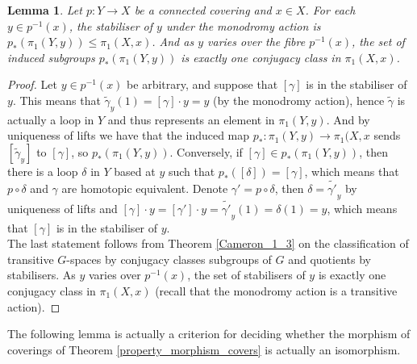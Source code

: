 \documentclass{article}
\theoremstyle{plain}
\newtheorem{lemma}[theorem]{Lemma}
\theoremstyle{definition}
\begin{document}
\begin{lemma}
\label{induced_subgroup}
    Let $p:Y\rightarrow X$ be a connected covering and $x\in X$. For each $y\in p^{-1}(x)$, the stabiliser of $y$ under the monodromy action is $p_*(\pi_1(Y,y)) \leq \pi_1(X,x)$. And as $y$ varies over the fibre $p^{-1}(x)$, the set of induced subgroups $p_*(\pi_1(Y,y))$ is exactly one conjugacy class in $\pi_1(X,x)$.
\end{lemma}
\begin{proof}
    Let $y\in p^{-1}(x)$ be arbitrary, and suppose that $[\gamma]$ is in the stabiliser of $y$.
    This means that $\widetilde{\gamma}_y(1) = [\gamma]\cdot y = y$ (by the monodromy action), hence $\widetilde{\gamma}$ is actually a loop in $Y$ and thus represents an element in $\pi_1(Y,y)$. And by uniqueness of lifts we have that the induced map $p_* : \pi_1(Y,y) \rightarrow \pi_1(X,x$ sends $[\widetilde{\gamma}_y]$ to $[\gamma]$, so $p_*(\pi_1(Y,y))$.
    Conversely, if $[\gamma] \in p_*(\pi_1(Y,y))$, then there is a loop $\delta$ in $Y$ based at $y$ such that $p_*([\delta]) = [\gamma]$, which means that $p\circ \delta$ and $\gamma$ are homotopic equivalent.
    Denote $\gamma' = p\circ \delta$, then $\delta = \widetilde{\gamma'}_y$ by uniqueness of lifts and $[\gamma]\cdot y = [\gamma']\cdot y = \widetilde{\gamma'}_y(1) = \delta(1) = y$, which means that $[\gamma]$ is in the stabiliser of $y$.\\
    The last statement follows from Theorem \ref{Cameron_1_3} on the classification of transitive $G$-spaces by conjugacy classes subgroups of $G$ and quotients by stabilisers. As $y$ varies over $p^{-1}(x)$, the set of stabilisers of $y$ is exactly one conjugacy class in $\pi_1(X,x)$ (recall that the monodromy action is a transitive action).
\end{proof}

\noindent The following lemma is actually a criterion for deciding whether the morphism of coverings of Theorem \ref{property_morphism_covers} is actually an isomorphism.
\end{document}
